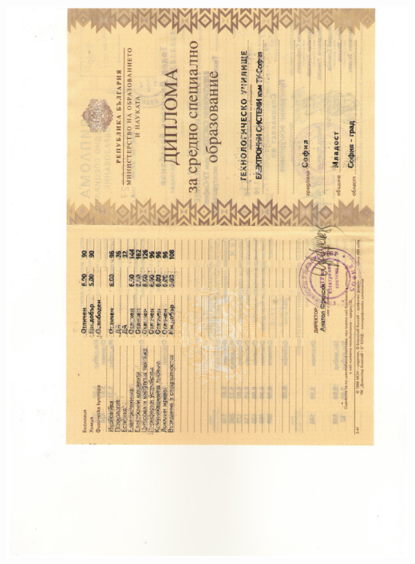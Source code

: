 \documentclass[english,a4paper]{europasscv}
\begin{document}
\includegraphics[width=\textwidth,height=\textheight,keepaspectratio]{DiplomaTUES1998_2}



\end{document}
